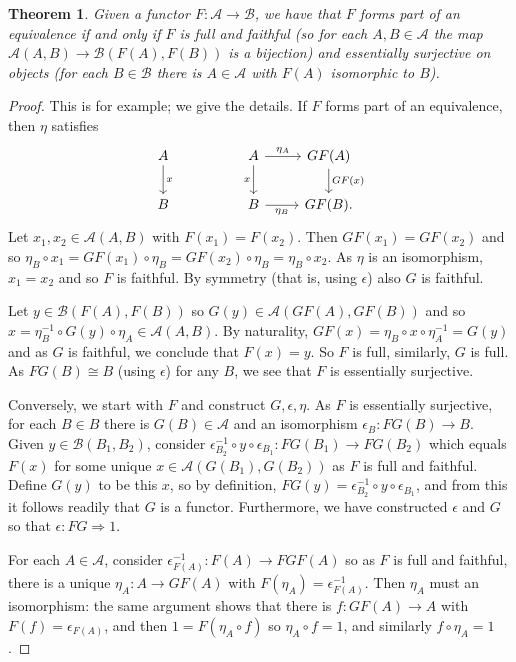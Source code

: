 \documentclass[a4paper,11pt]{article}
\theoremstyle{plain}
\newtheorem{theorem}[proposition]{Theorem}
\theoremstyle{remark}
\newcommand{\mc}[1]{\mathcal{#1}}
\begin{document}
\begin{theorem}\label{thm:cat_equiv_FFES}
Given a functor $F\colon\mc A\to\mc B$, we have that $F$ forms part of an equivalence if and only if $F$ is full and faithful (so for each $A,B\in\mc A$ the map $\mc A(A,B) \to \mc B(F(A),F(B))$ is a bijection) and essentially surjective on objects (for each $B\in\mc B$ there is $A\in\mc A$ with $F(A)$ isomorphic to $B$).
\end{theorem}
\begin{proof}
This is \cite[Proposition~1.3.18, Exercise~1.3.32]{Leinster_BasicCatTheory} for example; we give the details.  If $F$ forms part of an equivalence, then $\eta$ satisfies
\[ \begin{tikzcd}
  A \arrow[d, "x"] &&  A \arrow[r, "\eta_A"] \arrow[d, "x"'] & GF(A) \arrow[d, "GF(x)"] \\
  B &&  B \arrow[r, "\eta_B"'] & GF(B).
\end{tikzcd} \]
Let $x_1,x_2\in\mc A(A,B)$ with $F(x_1) = F(x_2)$.  Then $GF(x_1) = GF(x_2)$ and so $\eta_B \circ x_1 = GF(x_1) \circ \eta_B = GF(x_2) \circ \eta_B = \eta_B \circ x_2$.  As $\eta$ is an isomorphism, $x_1=x_2$ and so $F$ is faithful.  By symmetry (that is, using $\epsilon$) also $G$ is faithful.

Let $y \in \mc B(F(A), F(B))$ so $G(y) \in \mc A(GF(A), GF(B))$ and so $x = \eta_B^{-1} \circ G(y) \circ \eta_A \in \mc A(A,B)$.  By naturality, $GF(x) = \eta_B \circ x \circ \eta_A^{-1} = G(y)$ and as $G$ is faithful, we conclude that $F(x) = y$.  So $F$ is full, similarly, $G$ is full.
As $FG(B) \cong B$ (using $\epsilon$) for any $B$, we see that $F$ is essentially surjective.

Conversely, we start with $F$ and construct $G,\epsilon,\eta$.  As $F$ is essentially surjective, for each $B\in B$ there is $G(B)\in\mc A$ and an isomorphism $\epsilon_B \colon FG(B) \to B$.  Given $y \in \mc B(B_1,B_2)$, consider $\epsilon_{B_2}^{-1} \circ y \circ \epsilon_{B_1} \colon FG(B_1) \to FG(B_2)$ which equals $F(x)$ for some unique $x\in\mc A(G(B_1), G(B_2))$ as $F$ is full and faithful.  Define $G(y)$ to be this $x$, so by definition, $FG(y) = \epsilon_{B_2}^{-1} \circ y \circ \epsilon_{B_1}$, and from this it follows readily that $G$ is a functor.  Furthermore, we have constructed $\epsilon$ and $G$ so that $\epsilon \colon FG \Rightarrow 1$.

For each $A\in\mc A$, consider $\epsilon_{F(A)}^{-1} \colon F(A) \to FGF(A)$ so as $F$ is full and faithful, there is a unique $\eta_A \colon A \to GF(A)$ with $F(\eta_A) = \epsilon_{F(A)}^{-1}$.  Then $\eta_A$ must an isomorphism: the same argument shows that there is $f\colon GF(A) \to A$ with $F(f) = \epsilon_{F(A)}$, and then $1 = F(\eta_A \circ f)$ so $\eta_A\circ f=1$, and similarly $f\circ\eta_A=1$.


\end{proof}
\end{document}
